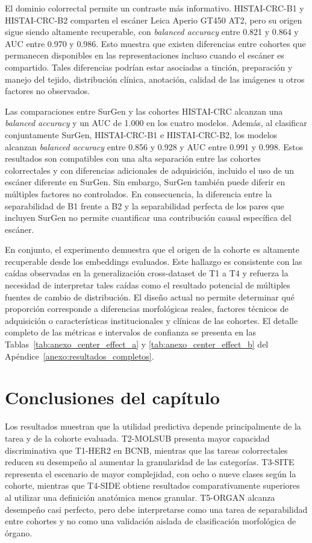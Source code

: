 El dominio colorrectal permite un contraste más informativo. HISTAI-CRC-B1 y HISTAI-CRC-B2 comparten el escáner Leica Aperio GT450 AT2, pero su origen sigue siendo altamente recuperable, con \textit{balanced accuracy} entre 0.821 y 0.864 y AUC entre 0.970 y 0.986. Esto muestra que existen diferencias entre cohortes que permanecen disponibles en las representaciones incluso cuando el escáner es compartido. Tales diferencias podrían estar asociadas a tinción, preparación y manejo del tejido, distribución clínica, anotación, calidad de las imágenes u otros factores no observados.

Las comparaciones entre SurGen y las cohortes HISTAI-CRC alcanzan una \textit{balanced accuracy} y un AUC de 1.000 en los cuatro modelos. Además, al clasificar conjuntamente SurGen, HISTAI-CRC-B1 e HISTAI-CRC-B2, los modelos alcanzan \textit{balanced accuracy} entre 0.856 y 0.928 y AUC entre 0.991 y 0.998. Estos resultados son compatibles con una alta separación entre las cohortes colorrectales y con diferencias adicionales de adquisición, incluido el uso de un escáner diferente en SurGen. Sin embargo, SurGen también puede diferir en múltiples factores no controlados. En consecuencia, la diferencia entre la separabilidad de B1 frente a B2 y la separabilidad perfecta de los pares que incluyen SurGen no permite cuantificar una contribución causal específica del escáner.

En conjunto, el experimento demuestra que el origen de la cohorte es altamente recuperable desde los embeddings evaluados. Este hallazgo es consistente con las caídas observadas en la generalización cross-dataset de T1 a T4 y refuerza la necesidad de interpretar tales caídas como el resultado potencial de múltiples fuentes de cambio de distribución. El diseño actual no permite determinar qué proporción corresponde a diferencias morfológicas reales, factores técnicos de adquisición o características institucionales y clínicas de las cohortes. El detalle completo de las métricas e intervalos de confianza se presenta en las Tablas~\ref{tab:anexo_center_effect_a} y \ref{tab:anexo_center_effect_b} del Apéndice~\ref{anexo:resultados_completos}.

\section{Conclusiones del capítulo}
\label{sec:sintesis_cap6}

Los resultados muestran que la utilidad predictiva depende principalmente de la tarea y de la cohorte evaluada. T2-MOLSUB presenta mayor capacidad discriminativa que T1-HER2 en BCNB, mientras que las tareas colorrectales reducen su desempeño al aumentar la granularidad de las categorías. T3-SITE representa el escenario de mayor complejidad, con ocho o nueve clases según la cohorte, mientras que T4-SIDE obtiene resultados comparativamente superiores al utilizar una definición anatómica menos granular. T5-ORGAN alcanza desempeño casi perfecto, pero debe interpretarse como una tarea de separabilidad entre cohortes y no como una validación aislada de clasificación morfológica de órgano.


